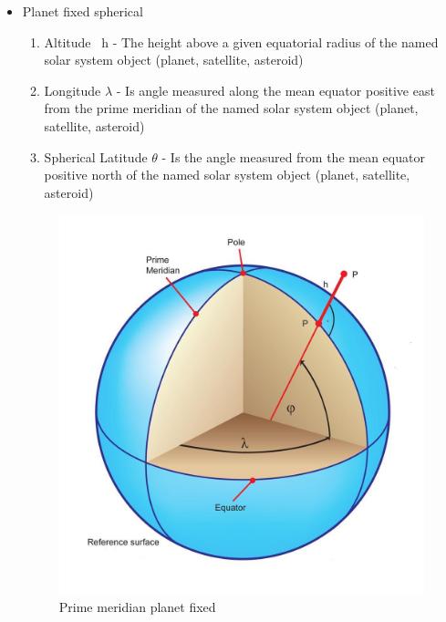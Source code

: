 \documentclass[twoside,11pt,titlepage]{report}
\begin{document}
\begin{itemize}
\label{reqt:sphere}\ \newline
\item Planet fixed spherical
\begin{enumerate}
\item Altitude ~h - The height above a given equatorial radius of the named solar system object (planet, satellite, asteroid)
\item Longitude {$\lambda$}  - Is angle measured along the mean equator positive east from the prime meridian of the named solar system object (planet, satellite, asteroid)
\item Spherical Latitude {$\theta$}  -  Is the angle measured from the mean equator positive north of the named solar system object (planet, satellite, asteroid)
\end{enumerate}
\begin{figure}[htp]
\centering
\includegraphics [width=7in]{figs/lonlat.jpg}
\caption{Prime meridian planet fixed}
\label{fig:1}
\end{figure}



\end{itemize}
\end{document}
